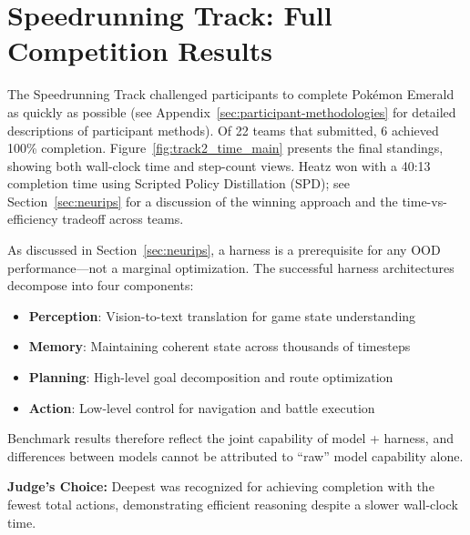 \section{Speedrunning Track: Full Competition Results}
\label{sec:track2-full-results}

The Speedrunning Track challenged participants to complete Pokémon Emerald as quickly as possible (see Appendix~\ref{sec:participant-methodologies} for detailed descriptions of participant methods). Of 22 teams that submitted, 6 achieved 100\% completion. Figure~\ref{fig:track2_time_main} presents the final standings, showing both wall-clock time and step-count views. Heatz won with a 40:13 completion time using Scripted Policy Distillation (SPD); see Section~\ref{sec:neurips} for a discussion of the winning approach and the time-vs-efficiency tradeoff across teams.

As discussed in Section~\ref{sec:neurips}, a harness is a prerequisite for any OOD performance---not a marginal optimization. The successful harness architectures decompose into four components:
\begin{itemize}
    \item \textbf{Perception}: Vision-to-text translation for game state understanding
    \item \textbf{Memory}: Maintaining coherent state across thousands of timesteps
    \item \textbf{Planning}: High-level goal decomposition and route optimization
    \item \textbf{Action}: Low-level control for navigation and battle execution
\end{itemize}
Benchmark results therefore reflect the joint capability of model + harness, and differences between models cannot be attributed to ``raw'' model capability alone.

\textbf{Judge's Choice:} Deepest was recognized for achieving completion with the fewest total actions, demonstrating efficient reasoning despite a slower wall-clock time.
